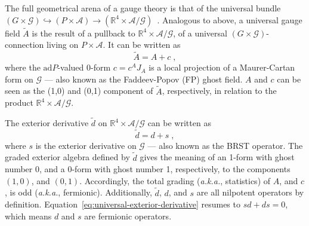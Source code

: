 \documentclass[../main/tex]{subfiles}
\begin{document}
The full geometrical arena of a gauge theory is that of the universal bundle $\left( G\times\mathcal{G} \right) \hookrightarrow \left( P \times \mathcal{A} \right) \rightarrow \left( \mathbb{R}^4\times\mathcal{A}/\mathcal{G} \right)$~\cite{baulieu1985a,baulieu1988a}. Analogous to above, a universal gauge field $\tilde{A}$ is the result of a pullback to $\mathbb{R}^4 \times \mathcal{A}/\mathcal{G}$, of a universal $\left( G \times \mathcal{G} \right)$-connection living on $P \times \mathcal{A}$. It can be written as
\begin{equation}
  \tilde{A} = A + c \;,
\end{equation}
where the $\mathrm{ad}P$-valued 0-form $c=c^A J_A$ is a local projection of a Maurer-Cartan form on $ \mathcal{G} $ --- also known as the Faddeev-Popov (FP) ghost field. $A$ and $c$ can be seen as the (1,0) and (0,1) component of $\tilde{A}$, respectively, in relation to the product $\mathbb{R}^4 \times \mathcal{A}/\mathcal{G}$.

The exterior derivative $\tilde{d}$ on $\mathbb{R}^4 \times \mathcal{A}/\mathcal{G}$ can be written as
\begin{equation}\label{eq:universal-exterior-derivative}
  \tilde{d} = d + s \;,
\end{equation}
where $s$ is the exterior derivative on $\mathcal{G}$ --- also known as the BRST operator. The graded exterior algebra defined by $\tilde{d}$ gives the meaning of an 1-form with ghost number 0, and a 0-form with ghost number 1, respectively, to the components $ \left( 1,0 \right) $, and $ \left( 0,1 \right) $. Accordingly, the total grading (\textit{a.k.a.}, statistics) of $A$, and $c$, is odd (\textit{a.k.a.}, fermionic). Additionally, $\tilde{d}$, $d$, and $s$ are all nilpotent operators by definition. Equation~\eqref{eq:universal-exterior-derivative} resumes to $sd+ds=0$, which means $d$ and $s$ are fermionic operators.
\end{document}
